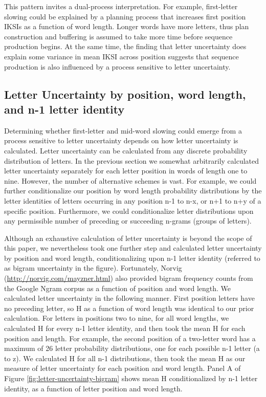 \documentclass[floatsintext,man]{apa6}
\theoremstyle{definition}
\theoremstyle{definition}
\theoremstyle{definition}
\theoremstyle{remark}
\begin{document}
This pattern invites a dual-process interpretation. For example,
first-letter slowing could be explained by a planning process that
increases first position IKSIs as a function of word length. Longer
words have more letters, thus plan construction and buffering is assumed
to take more time before sequence production begins. At the same time,
the finding that letter uncertainty does explain some variance in mean
IKSI across position suggests that sequence production is also
influenced by a process sensitive to letter uncertainty.

\subsection{Letter Uncertainty by position, word length, and n-1 letter
identity}\label{letter-uncertainty-by-position-word-length-and-n-1-letter-identity}

Determining whether first-letter and mid-word slowing could emerge from
a process sensitive to letter uncertainty depends on how letter
uncertainty is calculated. Letter uncertainty can be calculated from any
discrete probability distribution of letters. In the previous section we
somewhat arbitrarily calculated letter uncertainty separately for each
letter position in words of length one to nine. However, the number of
alternative schemes is vast. For example, we could further
conditionalize our position by word length probability distributions by
the letter identities of letters occurring in any position n-1 to n-x,
or n+1 to n+y of a specific position. Furthermore, we could
conditionalize letter distributions upon any permissible number of
preceding or succeeding n-grams (groups of letters).

Although an exhaustive calculation of letter uncertainty is beyond the
scope of this paper, we nevertheless took one further step and
calculated letter uncertainty by position and word length,
conditionalizing upon n-1 letter identity (referred to as bigram
uncertainty in the figure). Fortunately, Norvig
(\url{http://norvig.com/mayzner.html}) also provided bigram frequency
counts from the Google Ngram corpus as a function of position and word
length. We calculated letter uncertainty in the following manner. First
position letters have no preceding letter, so H as a function of word
length was identical to our prior calculation. For letters in positions
two to nine, for all word lengths, we calculated H for every n-1 letter
identity, and then took the mean H for each position and length. For
example, the second position of a two-letter word has a maximum of 26
letter probability distributions, one for each possible n-1 letter (a to
z). We calculated H for all n-1 distributions, then took the mean H as
our measure of letter uncertainty for each position and word length.
Panel A of Figure \ref{fig:letter-uncertainty-bigram} shows mean H
conditionalized by n-1 letter identity, as a function of letter position
and word length.
\end{document}
